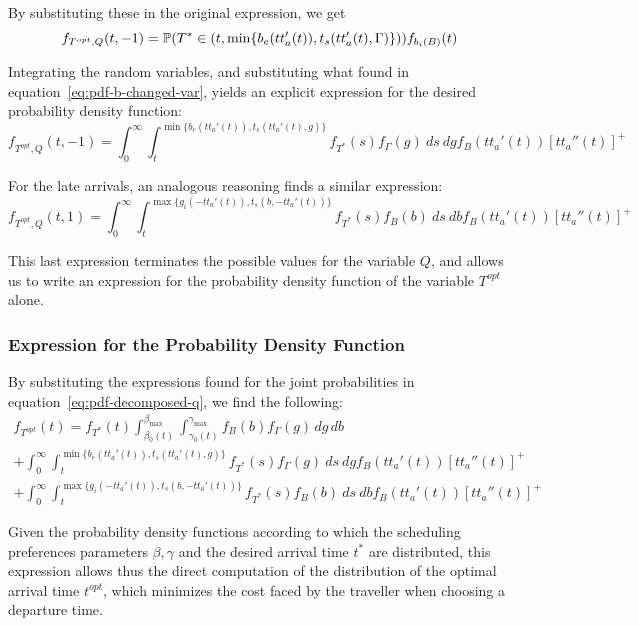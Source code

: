 By substituting these in the original expression, we get
\begin{equation}
  \label{eq:early-subst}
  f_{T^{opt}, Q}(t, -1) = \mathbb{P}(T^* \in (t, \min\{b_e(tt_a'(t)), t_s(tt_a'(t), \Gamma)\}))f_{b_i(B)}(t)
\end{equation}

Integrating the random variables,
and substituting what found in equation~\eqref{eq:pdf-b-changed-var},
yields an explicit expression for the desired probability density function:
\begin{equation}
  \label{eq:early-final}
  f_{T^{opt}, Q}(t, -1) = \int_0^\infty \int_t^{\min\{b_e(tt_a'(t)), t_s(tt_a'(t), g)\}}f_{T^*}(s) f_\Gamma(g)\ ds\ dg f_B(tt_a'(t)) [tt_a''(t)]^+
\end{equation}

For the late arrivals, an analogous reasoning finds a similar expression:
\begin{equation}
  \label{eq:late-final}
  f_{T^{opt}, Q}(t, 1) = \int_0^\infty \int_t^{\max\{g_i(-tt_a'(t)), t_s(b, -tt_a'(t))\}}f_{T^*}(s) f_B(b)\ ds\ db f_B(tt_a'(t)) [tt_a''(t)]^+
\end{equation}

This last expression terminates the possible values for the variable \(Q\),
and allows us to write an expression for the probability density function of the variable \(T^{opt}\) alone.

\subsubsection{Expression for the Probability Density Function}

By substituting the expressions found for the joint probabilities in equation~\eqref{eq:pdf-decomposed-q},
we find the following:
\begin{multline}
  \label{eq:pdf-final}
    f_{T^{opt}}(t) = f_{T^*}(t)\int_{\beta_0(t)}^{\beta_{\text{max}}}\int_{\gamma_0(t)}^{\gamma_{\text{max}}}f_B(b)f_\Gamma(g)\, dg\, db \\
    + \int_0^\infty \int_t^{\min\{b_e(tt_a'(t)), t_s(tt_a'(t), g)\}}f_{T^*}(s) f_\Gamma(g)\ ds\ dg f_B(tt_a'(t)) [tt_a''(t)]^+ \\
    + \int_0^\infty \int_t^{\max\{g_i(-tt_a'(t)), t_s(b, -tt_a'(t))\}}f_{T^*}(s) f_B(b)\ ds\ db f_B(tt_a'(t)) [tt_a''(t)]^+
\end{multline}

Given the probability density functions according to which the scheduling preferences parameters \(\beta, \gamma\) and the desired arrival time \(t^*\) are distributed,
this expression allows thus the direct computation of the distribution of the optimal arrival time \(t^{opt}\),
which minimizes the cost faced by the traveller when choosing a departure time.

